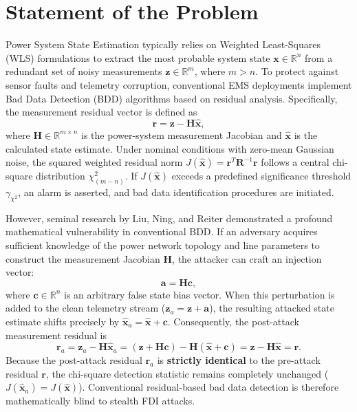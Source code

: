 \documentclass[12pt,a4paper]{report}
\begin{document}
\section{Statement of the Problem}
Power System State Estimation typically relies on Weighted Least-Squares (WLS)
formulations to extract the most probable system state $\boldsymbol{x} \in \mathbb{R}^n$
from a redundant set of noisy measurements $\boldsymbol{z} \in \mathbb{R}^m$, where
$m > n$. To protect against sensor faults and telemetry corruption, conventional
EMS deployments implement Bad Data Detection (BDD) algorithms based on residual
analysis. Specifically, the measurement residual vector is defined as
\begin{equation}
\boldsymbol{r} = \boldsymbol{z} - \boldsymbol{H}\hat{\boldsymbol{x}},
\label{eq:ch1_residual}
\end{equation}
where $\boldsymbol{H} \in \mathbb{R}^{m \times n}$ is the power-system measurement
Jacobian and $\hat{\boldsymbol{x}}$ is the calculated state estimate. Under nominal
conditions with zero-mean Gaussian noise, the squared weighted residual norm
$J(\hat{\boldsymbol{x}}) = \boldsymbol{r}^T \boldsymbol{R}^{-1} \boldsymbol{r}$
follows a central chi-square distribution $\chi^2_{(m-n)}$. If $J(\hat{\boldsymbol{x}})$
exceeds a predefined significance threshold $\gamma_{\chi^2}$, an alarm is asserted,
and bad data identification procedures are initiated.

However, seminal research by Liu, Ning, and Reiter \cite{liu2009,liu2011} demonstrated
a profound mathematical vulnerability in conventional BDD. If an adversary acquires
sufficient knowledge of the power network topology and line parameters to construct
the measurement Jacobian $\boldsymbol{H}$, the attacker can craft an injection
vector:
\begin{equation}
\boldsymbol{a} = \boldsymbol{H}\boldsymbol{c},
\label{eq:ch1_stealth}
\end{equation}
where $\boldsymbol{c} \in \mathbb{R}^n$ is an arbitrary false state bias vector. When
this perturbation is added to the clean telemetry stream ($\boldsymbol{z}_a = \boldsymbol{z} + \boldsymbol{a}$),
the resulting attacked state estimate shifts precisely by $\hat{\boldsymbol{x}}_a = \hat{\boldsymbol{x}} + \boldsymbol{c}$.
Consequently, the post-attack measurement residual is
\begin{equation}
\boldsymbol{r}_a = \boldsymbol{z}_a - \boldsymbol{H}\hat{\boldsymbol{x}}_a = (\boldsymbol{z} + \boldsymbol{H}\boldsymbol{c}) - \boldsymbol{H}(\hat{\boldsymbol{x}} + \boldsymbol{c}) = \boldsymbol{z} - \boldsymbol{H}\hat{\boldsymbol{x}} = \boldsymbol{r}.
\end{equation}
Because the post-attack residual $\boldsymbol{r}_a$ is \textbf{strictly identical}
to the pre-attack residual $\boldsymbol{r}$, the chi-square detection statistic
remains completely unchanged ($J(\hat{\boldsymbol{x}}_a) = J(\hat{\boldsymbol{x}})$).
Conventional residual-based bad data detection is therefore mathematically blind to
stealth FDI attacks.
\end{document}
